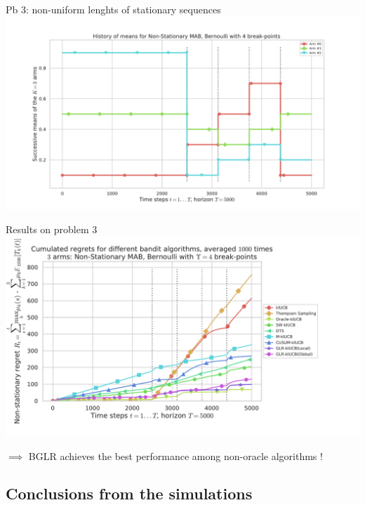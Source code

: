 \documentclass[11pt,english,ignorenonframetext,]{beamer}
\begin{document}
\begin{frame}[plain]{Pb 3: non-uniform lenghts of stationary sequences}
  \centering
  \includegraphics[width=1.00\textwidth]{figures/Problem_4.pdf}
\end{frame}

\begin{frame}[plain]{Results on problem 3}
  \centering
  \includegraphics[width=1.05\textwidth]{figures/regret_problem4.pdf}

  $\implies$ BGLR achieves the best performance among non-oracle algorithms \dCooley{} !
\end{frame}


\subsection{\hfill{}Conclusions from the simulations\hfill{}}
\end{document}
